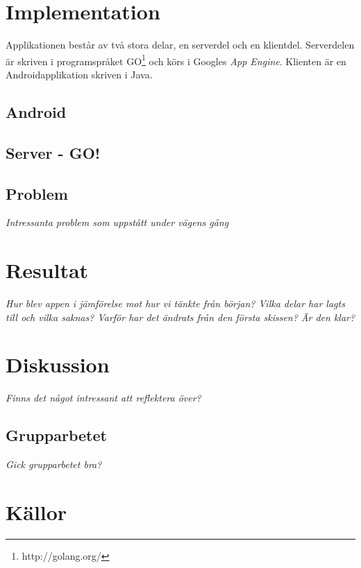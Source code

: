 \documentclass[11pt,a4paper]{article}
\begin{document}
\section{Implementation}
Applikationen består av två stora delar, en serverdel och en klientdel. Serverdelen är skriven i programspråket GO\footnote{http://golang.org/} och körs i Googles \textit{App Engine}. Klienten är en Androidapplikation skriven i Java.

\subsection{Android}

\subsection{Server - GO!}

\subsection{Problem}
\textit{Intressanta problem som uppstått under vägens gång}

\section{Resultat}
\textit{Hur blev appen i jämförelse mot hur vi tänkte från början? Vilka delar har lagts till och vilka saknas? Varför har det ändrats från den första skissen? Är den klar?}

\section{Diskussion}
\textit{Finns det något intressant att reflektera över?}

\subsection{Grupparbetet}
\textit{Gick grupparbetet bra?}

\section{Källor}
\appendix
\end{document}
